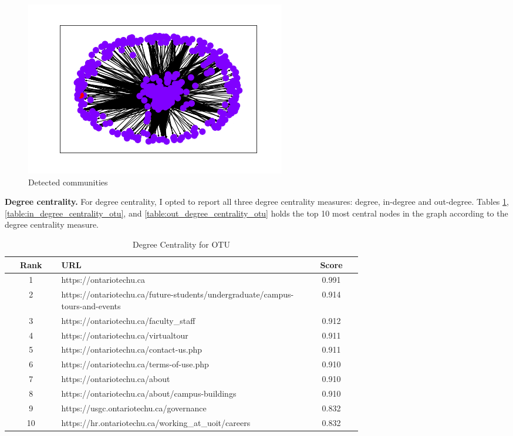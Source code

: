 \begin{figure}
    \centering
    \includegraphics[width=0.75\linewidth]{img/otu_communities.png}
    \caption{Detected communities}
    \label{fig:7}
\end{figure}

\textbf{Degree centrality.} For degree centrality, I opted to report all three degree centrality measures: degree, in-degree and out-degree. Tables \ref{table:degree_centrality_otu}, \ref{table:in_degree_centrality_otu}, and \ref{table:out_degree_centrality_otu} holds the top 10 most central nodes in the graph according to the degree centrality measure.

\begin{table}
    \centering
    \begin{tabular}{|c|p{0.7\linewidth}|c|}
        \hline
        \textbf{Rank} & \textbf{URL} & \textbf{Score} \\
        \hline
        1 & https://ontariotechu.ca & 0.991 \\ \hline
        2 & https://ontariotechu.ca/future-students/undergraduate/campus-tours-and-events & 0.914 \\ \hline
        3 & https://ontariotechu.ca/faculty\_staff & 0.912 \\ \hline
        4 & https://ontariotechu.ca/virtualtour & 0.911 \\ \hline
        5 & https://ontariotechu.ca/contact-us.php & 0.911 \\ \hline
        6 & https://ontariotechu.ca/terms-of-use.php & 0.910 \\ \hline
        7 & https://ontariotechu.ca/about & 0.910 \\ \hline
        8 & https://ontariotechu.ca/about/campus-buildings & 0.910 \\ \hline
        9 & https://usgc.ontariotechu.ca/governance & 0.832 \\ \hline
        10 & https://hr.ontariotechu.ca/working\_at\_uoit/careers & 0.832 \\ \hline
    \end{tabular}
    \caption{Degree Centrality for OTU}
    \label{table:degree_centrality_otu}
\end{table}

